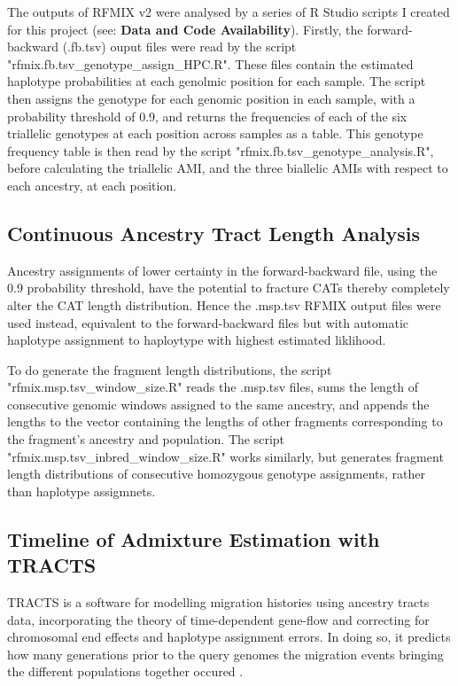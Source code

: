 \documentclass[11pt]{article}
\begin{document}
The outputs of RFMIX v2 were analysed by a series of R Studio scripts I created for this project (see: \textbf{Data and Code Availability}). Firstly, the forward-backward (.fb.tsv) ouput files were read by the script "rfmix.fb.tsv\_genotype\_assign\_HPC.R". These files contain the estimated haplotype probabilities at each genolmic position for each sample. The script then assigns the genotype for each genomic position in each sample, with a probability threshold of 0.9, and returns the frequencies of each of the six triallelic genotypes at each position across samples as a table. This genotype frequency table is then read by the script "rfmix.fb.tsv\_genotype\_analysis.R", before calculating the triallelic AMI, and the three biallelic AMIs with respect to each ancestry, at each position.






\subsection{Continuous Ancestry Tract Length Analysis}

Ancestry assignments of lower certainty in the forward-backward file, using the 0.9 probability threshold, have the potential to fracture CATs thereby completely alter the CAT length distribution. Hence the .msp.tsv RFMIX output files were used instead, equivalent to the forward-backward files but with automatic haplotype assignment to haploytype with highest estimated liklihood.

To do generate the fragment length distributions, the script "rfmix.msp.tsv\_window\_size.R" reads the .msp.tsv files, sums the length of consecutive genomic windows assigned to the same ancestry, and appends the lengths to the vector containing the lengths of other fragments corresponding to the fragment's ancestry and population. The script "rfmix.msp.tsv\_inbred\_window\_size.R" works similarly, but generates fragment length distributions of consecutive homozygous genotype assignments, rather than haplotype assigmnets. 





\subsection{Timeline of Admixture Estimation with TRACTS}

TRACTS is a software for modelling migration histories using ancestry tracts data, incorporating the theory of time-dependent gene-flow and correcting for chromosomal end effects and haplotype assignment errors. In doing so, it predicts how many generations prior to the query genomes the migration events bringing the different populations together occured \parencite{Gravel2012}.
\end{document}
